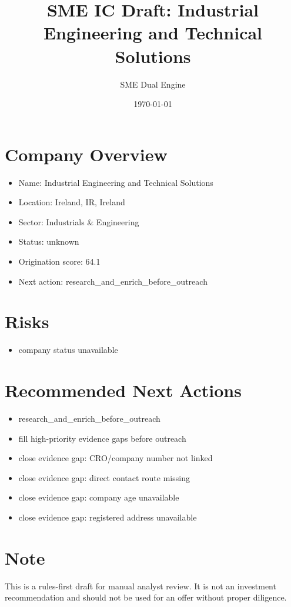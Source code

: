 \documentclass[11pt,a4paper]{article}
\title{SME IC Draft: Industrial Engineering and Technical Solutions}
\author{SME Dual Engine}
\date{\today}
\begin{document}
\maketitle
\section*{Company Overview}
\begin{itemize}[leftmargin=1.4em]
\item Name: Industrial Engineering and Technical Solutions
\item Location: Ireland, IR, Ireland
\item Sector: Industrials \& Engineering
\item Status: unknown
\item Origination score: 64.1
\item Next action: research\_and\_enrich\_before\_outreach
\end{itemize}
\section*{Risks}
\begin{itemize}[leftmargin=1.4em]
\item company status unavailable
\end{itemize}
\section*{Recommended Next Actions}
\begin{itemize}[leftmargin=1.4em]
\item research\_and\_enrich\_before\_outreach
\item fill high-priority evidence gaps before outreach
\item close evidence gap: CRO/company number not linked
\item close evidence gap: direct contact route missing
\item close evidence gap: company age unavailable
\item close evidence gap: registered address unavailable
\end{itemize}
\section*{Note}
This is a rules-first draft for manual analyst review. It is not an investment
recommendation and should not be used for an offer without proper diligence.
\end{document}
